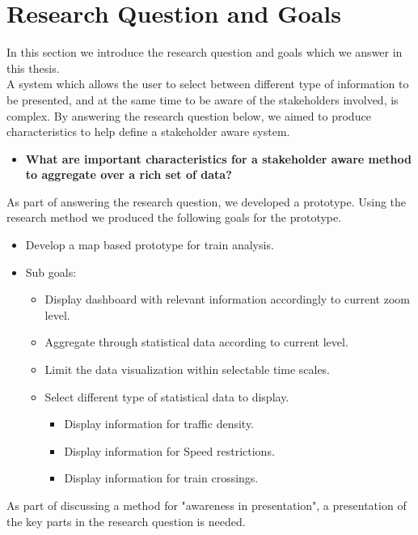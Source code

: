 \section{Research Question and Goals} %
\label{sec:intro_research_question}
In this section we introduce the research question and goals which we 
answer in this thesis.\\

A system which allows the user to select between different type of information
to be presented, and at the same time to be aware of the stakeholders 
involved, is complex. By answering the research question
below, we aimed to produce characteristics to help define a
stakeholder aware system.\\

\begin{itemize}
	\item \textbf{What are important characteristics for a stakeholder aware 
	method to aggregate over a rich set of data?}
\end{itemize}

As part of answering the research question, we developed a prototype. Using the
research method we produced the following goals for the prototype.

\begin{itemize}
	\item Develop a map based prototype for train analysis.
	\item Sub goals:
	\begin{itemize}
		\item Display dashboard with relevant information accordingly to 
		current zoom level.
		\item Aggregate through statistical data according to current level.
		\item Limit the data visualization within selectable time scales.
		\item Select different type of statistical data to display.
		\begin{itemize}
			\item Display information for traffic density.
			\item Display information for Speed restrictions.
			\item Display information for train crossings.
		\end{itemize}
	\end{itemize}
\end{itemize}

As part of discussing a method for "awareness in presentation", a presentation
of the key parts in the research question is needed. 

